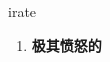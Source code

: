 
\begin{frame}
{\huge irate}
\begin{center}
\begin{enumerate}\Large
  \item \textbf{极其愤怒的}
\end{enumerate}
\end{center}
\end{frame}
